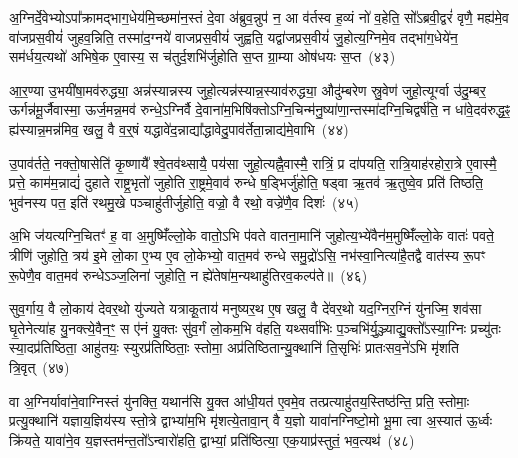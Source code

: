{\anuvakamend[{वि वै य॒ज्ञः साम॑ च म॒ इत्या॑ह च ति॒स्रश्चैका॒न्नप॑ञ्चा॒शच्च॑}]}%

अ॒ग्निर्दे॒वेभ्यो\-ऽपा᳚क्रामद्भाग॒धेय॑मि॒च्छमा॑न॒स्तं दे॒वा अ॑ब्रुव॒न्नुप॑ न॒ आ व॑र्तस्व ह॒व्यं नो॑ व॒हेति॒ सो᳚\-ऽब्रवी॒द्वरं॑ वृणै॒ मह्य॑मे॒व वा॑जप्रस॒वीयं॑ जुहव॒न्निति॒ तस्मा॑द॒ग्नये॑ वाजप्रस॒वीयं॑ जुह्वति॒ यद्वा॑जप्रस॒वीयं॑ जु॒होत्य॒ग्निमे॒व तद्भा॑ग॒धेये॑न॒ सम॑र्धय॒त्यथो॑ अभिषे॒क ए॒वास्य॒ स च॑तुर्द॒शभि॑र्जुहोति स॒प्त ग्रा॒म्या ओष॑धयः स॒प्त~(४३)

आ॒र॒ण्या उ॒भयी॑षा॒मव॑रुद्ध्या॒ अन्न॑स्यान्नस्य जुहो॒त्यन्न॑स्यान्न॒स्याव॑रुद्ध्या॒ औदु॑म्बरेण स्रु॒वेण॑ जुहो॒त्यूर्ग्वा उ॑दु॒म्बर॒ ऊर्गन्न॑मू॒र्जैवास्मा॒ ऊर्ज॒मन्न॒मव॑ रुन्धे॒\-ऽग्निर्वै दे॒वाना॑म॒भिषि॑क्तो\-ऽग्नि॒चिन्म॑नु॒ष्या॑णा॒न्तस्मा॑दग्नि॒चिद्वर्\mbox{}ष॑ति॒ न धा॑वे॒दव॑रुद्ध॒ꣴ॒ ह्य॑स्यान्न॒मन्न॑मिव॒ खलु॒ वै व॒र्॒\mbox{}षं यद्धावे॑द॒न्नाद्या᳚द्धावेदु॒पाव॑र्तेता॒न्नाद्य॑मे॒वाभि~(४४)

उ॒पाव॑र्तते॒ नक्तो॒षासेति॑ कृ॒ष्णायै᳚ श्वे॒तव॑थ्सायै॒ पय॑सा जुहो॒त्यह्नै॒वास्मै॒ रात्रिं॒ प्र दा॑पयति॒ रात्रि॒याह॑रहोरा॒त्रे ए॒वास्मै॒ प्रत्ते॒ काम॑म॒न्नाद्यं॑ दुहाते राष्ट्र॒भृतो॑ जुहोति रा॒ष्ट्रमे॒वाव॑ रुन्धे ष॒ड्भिर्जु॑होति॒ षड्वा ऋ॒तव॑ ऋ॒तुष्वे॒व प्रति॑ तिष्ठति॒ भुव॑नस्य पत॒ इति॑ रथमु॒खे पञ्चाहु॑तीर्जुहोति॒ वज्रो॒ वै रथो॒ वज्रे॑णै॒व दिशः॑~(४५)

अ॒भि ज॑यत्यग्नि॒चितꣳ॑ ह॒ वा अ॒मुष्मिँ॑ल्लो॒के वातो॒\-ऽभि प॑वते वातना॒मानि॑ जुहोत्य॒भ्ये॑वैन॑म॒मुष्मिँ॑ल्लो॒के वातः॑ पवते॒ त्रीणि॑ जुहोति॒ त्रय॑ इ॒मे लो॒का ए॒भ्य ए॒व लो॒केभ्यो॒ वात॒मव॑ रुन्धे समु॒द्रो॑\-ऽसि॒ नभ॑स्वा॒नित्या॑है॒तद्वै वात॑स्य रू॒पꣳ रू॒पेणै॒व वात॒मव॑ रुन्धे\-ऽञ्ज॒लिना॑ जुहोति॒ न ह्ये॑तेषा॑म॒न्यथाहु॑तिरव॒कल्प॑ते॥~(४६)

{\anuvakamend[{ओष॑धयः स॒प्ताभि दिशो॒\-ऽन्यथा॒ द्वे च॑}]}%

सुव॒र्गाय॒ वै लो॒काय॑ देवर॒थो यु॑ज्यते यत्राकू॒ताय॑ मनुष्यर॒थ ए॒ष खलु॒ वै दे॑वर॒थो यद॒ग्निर॒ग्निं यु॑नज्मि॒ शव॑सा घृ॒तेनेत्या॑ह यु॒नक्त्ये॒वैन॒ꣳ॒ स ए॑नं यु॒क्तः सु॑व॒र्गं लो॒कम॒भि व॑हति॒ यथ्सर्वा॑भिः प॒ञ्चभि॑र्यु॒ञ्ज्याद्यु॒क्तो᳚\-ऽस्या॒ग्निः प्रच्यु॑तः स्या॒दप्र॑तिष्ठिता॒ आहु॑तयः॒ स्युरप्र॑तिष्ठिताः॒ स्तोमा॒ अप्र॑तिष्ठितान्यु॒क्थानि॑ ति॒सृभिः॑ प्रातःसव॒ने॑\-ऽभि मृ॑शति त्रि॒वृत्~(४७)

वा अ॒ग्निर्यावा॑ने॒वाग्निस्तं यु॑नक्ति॒ यथान॑सि यु॒क्त आ॑धी॒यत॑ ए॒वमे॒व तत्प्रत्याहु॑तय॒स्तिष्ठ॑न्ति॒ प्रति॒ स्तोमाः॒ प्रत्यु॒क्थानि॑ यज्ञाय॒ज्ञिय॑स्य स्तो॒त्रे द्वाभ्या॑म॒भि मृ॑शत्ये॒तावा॒न् वै य॒ज्ञो यावा॑नग्निष्टो॒मो भू॒मा त्वा अ॒स्यात॑ ऊ॒र्ध्वः क्रि॑यते॒ यावा॑ने॒व य॒ज्ञस्तम॑न्त॒तो᳚\-ऽन्वारो॑हति॒ द्वाभ्यां॒ प्रति॑ष्ठित्या॒ एक॒याप्र॑स्तुतं॒ भव॒त्यथ॑~(४८)

